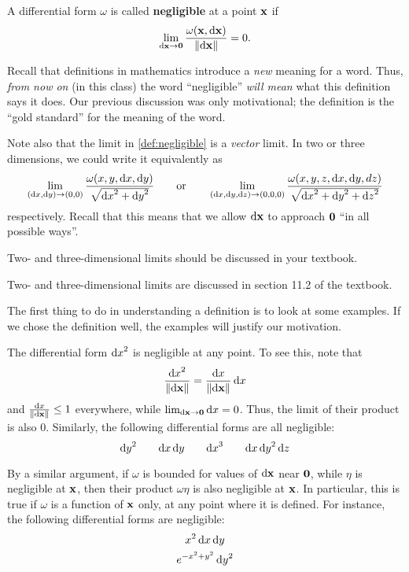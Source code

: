 \documentclass[12pt]{amsart}
\begin{document}
\begin{defn}\label{def:negligible}
  A differential form $\omega$ is called \textbf{negligible} at a point $\mathbf{x}$ if
  \[ \lim_{{\mathrm{d} \mathbf{x}}\to\mathbf{0}} \frac{\omega(\mathbf{x},{\mathrm{d} \mathbf{x}})}{\Vert {\ensuremath{\mathrm{d} \mathbf{x}}} \Vert} = 0. \]
\end{defn}

Recall that definitions in mathematics introduce a \emph{new} meaning for a word.
Thus, \emph{from now on} (in this class) the word ``negligible'' \emph{will mean} what this definition says it does.
Our previous discussion was only motivational; the definition is the ``gold standard'' for the meaning of the word.

Note also that the limit in \cref{def:negligible} is a \emph{vector} limit.
In two or three dimensions, we could write it equivalently as
\[ \lim_{({\mathrm{d} x},{\mathrm{d} y})\to(0,0)} \frac{\omega(x,y,{\mathrm{d} x},{\mathrm{d} y})}{\sqrt{{\mathrm{d} x}^2+{\mathrm{d} y}^2}} \qquad\text{or}\qquad
\lim_{({\mathrm{d} x},{\mathrm{d} y},{\mathrm{d} z})\to(0,0,0)} \frac{\omega(x,y,z,{\mathrm{d} x},{\mathrm{d} y},dz)}{\sqrt{{\mathrm{d} x}^2+{\mathrm{d} y}^2+{\mathrm{d} z}^2}}
\]
respectively.
Recall that this means that we allow ${\mathrm{d} \mathbf{x}}$ to approach $\mathbf{0}$ ``in all possible ways''.
\begin{notextbook}Two- and three-dimensional limits should be discussed in your textbook.\end{notextbook}%
\begin{stewart}Two- and three-dimensional limits are discussed in section 11.2 of the textbook.\end{stewart}

The first thing to do in understanding a definition is to look at some examples.
If we chose the definition well, the examples will justify our motivation.

\begin{eg}
  The differential form ${\mathrm{d} x}^2$ is negligible at any point.
  To see this, note that
  \[ \frac{{\mathrm{d} x}^2}{\Vert {\ensuremath{\mathrm{d} \mathbf{x}}} \Vert} = \frac{{\mathrm{d} x}}{\Vert {\ensuremath{\mathrm{d} \mathbf{x}}} \Vert} \,{\mathrm{d} x} \]
  and $\frac{{\mathrm{d} x}}{\Vert {\ensuremath{\mathrm{d} \mathbf{x}}} \Vert}\le 1$ everywhere, while $\lim_{{\mathrm{d} \mathbf{x}}\to\mathbf{0}} {\mathrm{d} x} = 0$.
  Thus, the limit of their product is also $0$.
  Similarly, the following differential forms are all negligible:
  \[ {\mathrm{d} y}^2 \qquad {\ensuremath{\mathrm{d} x}}\,{\mathrm{d} y} \qquad {\ensuremath{\mathrm{d} x}}^3 \qquad {\ensuremath{\mathrm{d} x}}\,{\mathrm{d} y}^2\,{\mathrm{d} z} \]
\end{eg}

\begin{eg}
  By a similar argument, if $\omega$ is bounded for values of ${\mathrm{d} \mathbf{x}}$ near $\mathbf{0}$, while $\eta$ is negligible at $\mathbf{x}$, then their product $\omega\eta$ is also negligible at $\mathbf{x}$.
  In particular, this is true if $\omega$ is a function of $\mathbf{x}$ only, at any point where it is defined.
  For instance, the following differential forms are negligible:
  \begin{gather*}
    x^2\,{\mathrm{d} x}\,{\mathrm{d} y}\\
    e^{-x^2+y^2} \,{\mathrm{d} y}^2
  \end{gather*}
\end{eg}
\end{document}
